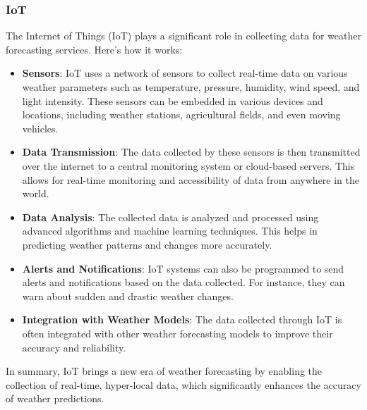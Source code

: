\documentclass[../paper.tex]{subfiles}
\begin{document}
    \subsubsection{IoT}
    The Internet of Things (IoT) plays a significant role in collecting data for weather forecasting services.
    Here's how it works:

    \begin{itemize}
        \item \textbf{Sensors}: IoT uses a network of sensors to collect real-time data on various weather parameters such as temperature, pressure, humidity, wind speed, and light intensity\cite{iot1, iot4}.
        These sensors can be embedded in various devices and locations, including weather stations, agricultural fields, and even moving vehicles\cite{iot1, iot4}.
        \item \textbf{Data Transmission}: The data collected by these sensors is then transmitted over the internet to a central monitoring system or cloud-based servers\cite{iot1, iot3}.
        This allows for real-time monitoring and accessibility of data from anywhere in the world\cite{iot1}.
        \item \textbf{Data Analysis}: The collected data is analyzed and processed using advanced algorithms and machine learning techniques.
        This helps in predicting weather patterns and changes more accurately\cite{iot1, iot3}.
        \item \textbf{Alerts and Notifications}: IoT systems can also be programmed to send alerts and notifications based on the data collected.
        For instance, they can warn about sudden and drastic weather changes\cite{iot1}.
        \item \textbf{Integration with Weather Models}: The data collected through IoT is often integrated with other weather forecasting models to improve their accuracy and reliability\cite{iot3}.
    \end{itemize}

    In summary, IoT brings a new era of weather forecasting by enabling the collection of real-time, hyper-local data, which significantly enhances the accuracy of weather predictions\cite{iot4}.
\end{document}

